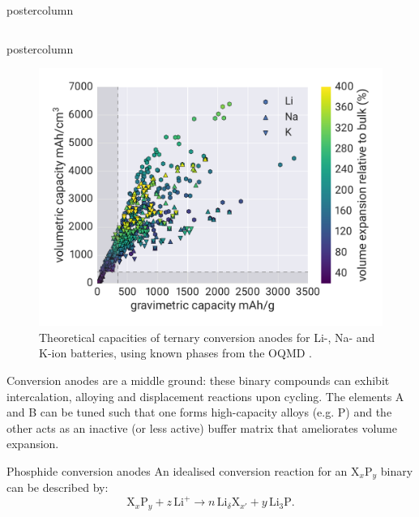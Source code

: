 \documentclass{beamer}
\begin{document}
\begin{frame}
\begin{columns}
\begin{column}{.57\textwidth}
\begin{beamercolorbox}[center]{postercolumn}
\begin{minipage}{.98\textwidth}
{\begin{columns}
\begin{column}{.48\textwidth}
\begin{beamercolorbox}[left]{postercolumn}
\begin{minipage}{\textwidth}
{\begin{myblock}{}
                  \begin{figure}[h]
              \centering
              \includegraphics[width=\textwidth]{img/anodes.pdf}
              \caption{Theoretical capacities of ternary conversion anodes for Li-, Na- and K-ion batteries, using known phases from the OQMD \cite{Kirklin2015}.}
            \end{figure}
Conversion anodes are a middle ground: these binary compounds can exhibit intercalation, alloying and displacement reactions upon cycling. The elements A and B can be tuned such that one forms high-capacity alloys (e.g. P) and the other acts as an inactive (or less active) buffer matrix that ameliorates volume expansion.

					\end{myblock}
					\begin{myblock}{Phosphide conversion anodes}
              An idealised conversion reaction for an X$_x$P$_y$ binary can be described by:
          \[ \text{X}_x \text{P}_y + z\,\text{Li}^+ \to n\,\text{Li}_\delta\text{X}_{x'} + y\,\text{Li}_3\text{P}.\]


\end{myblock}}
\end{minipage}
\end{beamercolorbox}
\end{column}
\end{columns}}
\end{minipage}
\end{beamercolorbox}
\end{column}
\end{columns}
\end{frame}
\end{document}

